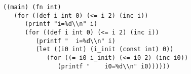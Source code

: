  \begin{verbatim}
((main) (fn int)
   (for ((def i int 0) (<= i 2) (inc i))
      (printf "i=%d\\n" i)
      (for ((def i int 0) (<= i 2) (inc i))
         (printf "  i=%d\\n" i)
         (let ((i0 int) (i_init (const int) 0))
            (for ((= i0 i_init) (<= i0 2) (inc i0))
               (printf "    i0=%d\\n" i0))))))
\end{verbatim} 
